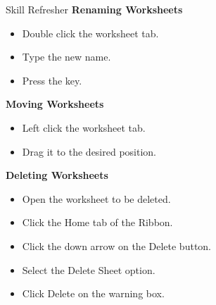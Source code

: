 \begin{center}
	\begin{sklbox}{Skill Refresher}
		\textbf{Renaming Worksheets}
		\\
		\begin{itemize}
			\setlength{\itemsep}{0pt}
			\setlength{\parskip}{0pt}
			\setlength{\parsep}{0pt}
			
			\item Double click the worksheet tab.
			\item Type the new name.
			\item Press the  key.
		\end{itemize}

		\hfill \break
		\textbf{Moving Worksheets}
		\\
		\begin{itemize}
			\setlength{\itemsep}{0pt}
			\setlength{\parskip}{0pt}
			\setlength{\parsep}{0pt}
			
			\item Left click the worksheet tab.
			\item Drag it to the desired position.
		\end{itemize}

		\hfill \break
		\textbf{Deleting Worksheets}
		\\
		\begin{itemize}
			\setlength{\itemsep}{0pt}
			\setlength{\parskip}{0pt}
			\setlength{\parsep}{0pt}
			
			\item Open the worksheet to be deleted.
			\item Click the Home tab of the Ribbon.
			\item Click the down arrow on the Delete button.
			\item Select the Delete Sheet option.
			\item Click Delete on the warning box.
		\end{itemize}

	\end{sklbox}
\end{center}

